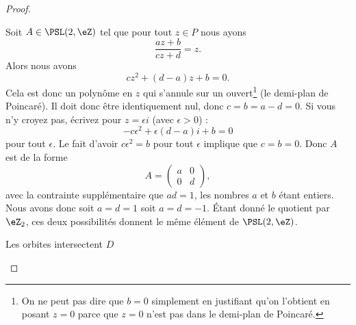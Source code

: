 \begin{proof}
\begin{subproof}
            Soit \( A\in\PSL(2,\eZ)\) tel que pour tout \( z\in P\) nous ayons
            \begin{equation}
                \frac{ az+b }{ cz+d }=z.
            \end{equation}
            Alors nous avons
            \begin{equation}
                cz^2+(d-a)z+b=0.
            \end{equation}
            Cela est donc un polynôme en \( z\) qui s'annule sur un ouvert\footnote{On ne peut pas dire que \( b=0\) simplement en justifiant qu'on l'obtient en posant \( z=0\) parce que \( z=0\) n'est pas dans le demi-plan de Poincaré.} (le demi-plan de Poincaré). Il doit donc être identiquement nul, donc \( c=b=a-d=0\). Si vous n'y croyez pas, écrivez pour \( z=\epsilon i\) (avec \( \epsilon>0\)) :
            \begin{equation}
                -c\epsilon^2+\epsilon(d-a)i+b=0
            \end{equation}
            pour tout \( \epsilon\). Le fait d'avoir \( c\epsilon^2=b\) pour tout \( \epsilon\) implique que \( c=b=0\). Donc \( A\) est de la forme
            \begin{equation}
                A=\begin{pmatrix}
                    a    &   0    \\
                    0    &   d
                \end{pmatrix},
            \end{equation}
            avec la contrainte supplémentaire que \( ad=1\), les nombres \( a\) et \( b\) étant entiers. Nous avons donc soit \( a=d=1\) soit \( a=d=-1\). Étant donné le quotient par \( \eZ_2\), ces deux possibilités donnent le même élément de \( \PSL(2,\eZ)\).


        \item[Les orbites intersectent \( D\)]


\end{subproof}
\end{proof}
